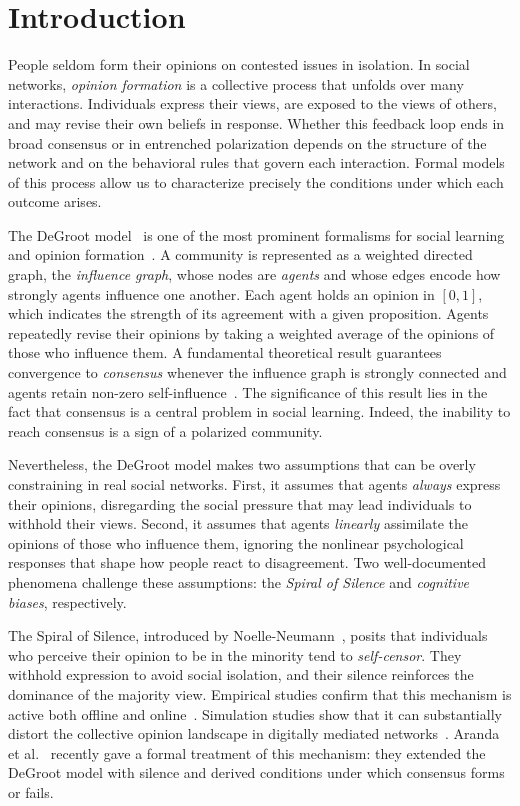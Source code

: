 \section{Introduction}
\label{sec:intro}

People seldom form their opinions on contested issues in isolation. In
social networks, \emph{opinion formation} is a collective process that
unfolds over many interactions. Individuals express their views, are exposed to
the views of others, and may revise their own beliefs in response. Whether
this feedback loop ends in broad consensus or in entrenched polarization
depends on the structure of the network and on the behavioral rules that
govern each interaction. Formal models of this process allow us to
characterize precisely the conditions under which each outcome arises.

The DeGroot model~\cite{DeGroot1974} is one of the most prominent formalisms
for social learning and opinion formation~\cite{Castellano2009}. A community is
represented as a weighted directed graph, the \emph{influence graph}, whose
nodes are \emph{agents} and whose edges encode how strongly agents influence
one another. Each agent holds an opinion in $[0,1]$, which indicates the
strength of its agreement with a given proposition. Agents repeatedly revise
their opinions by taking a weighted average of the opinions of those who
influence them. A fundamental theoretical result guarantees convergence to
\emph{consensus} whenever the influence graph is strongly connected and agents
retain non-zero self-influence~\cite{DeGroot1974,Castellano2009}. The
significance of this result lies in the fact that consensus is a central
problem in social learning. Indeed, the inability to reach consensus is a sign
of a polarized community.

Nevertheless, the DeGroot model makes two assumptions that can be overly
constraining in real social networks. First, it assumes that agents
\emph{always} express their opinions, disregarding the social pressure that
may lead individuals to withhold their views. Second, it assumes that agents
\emph{linearly} assimilate the opinions of those who influence them, ignoring
the nonlinear psychological responses that shape how people react to
disagreement. Two well-documented phenomena challenge these assumptions: the
\emph{Spiral of Silence} and \emph{cognitive biases}, respectively.

The Spiral of Silence, introduced by
Noelle-Neumann~\cite{NoelleNeumann1974,NoelleNeumann1984}, posits that
individuals who perceive their opinion to be in the minority tend to
\emph{self-censor}. They withhold expression to avoid social isolation, and
their silence reinforces the dominance of the majority view. Empirical studies
confirm that this mechanism is active both offline and
online~\cite{Glynn1997,Hampton2014,Hampton2019,Neubaum2018,Sohn2022}.
Simulation studies show that it can substantially distort the collective
opinion landscape in digitally mediated
networks~\cite{Sohn2022,Wang2013,Ross2019,Cabrera2021}. Aranda et
al.~\cite{aranda2024sound} recently gave a formal treatment of this mechanism:
they extended the DeGroot model with silence and derived conditions under
which consensus forms or fails.

